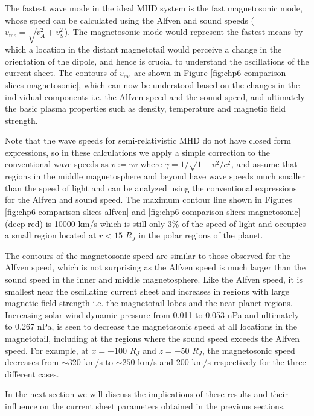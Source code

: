 The fastest wave mode in the ideal MHD system is the fast magnetosonic mode, whose speed can be calculated using the Alfven and sound speeds ($v_\text{ms} = \sqrt{v_A^2 + v_S^2}$). The magnetosonic mode would represent the fastest means by which a location in the distant magnetotail would perceive a change in the orientation of the dipole, and hence is crucial to understand the oscillations of the current sheet. The contours of $v_\text{ms}$ are shown in Figure \ref{fig:chp6-comparison-slices-magnetosonic}, which can now be understood based on the changes in the individual components i.e. the Alfven speed and the sound speed, and ultimately the basic plasma properties such as density, temperature and magnetic field strength. 

Note that the wave speeds for semi-relativistic MHD do not have closed form expressions, so in these calculations we apply a simple correction to the conventional wave speeds as $v := \gamma v$ where $\gamma = 1/\sqrt{1+v^2/c^2}$, and assume that regions in the middle magnetosphere and beyond have wave speeds much smaller than the speed of light and can be analyzed using the conventional expressions for the Alfven and sound speed. The maximum contour line shown in Figures \ref{fig:chp6-comparison-slices-alfven} and \ref{fig:chp6-comparison-slices-magnetosonic} (deep red) is 10000 km/s which is still only 3\% of the speed of light and occupies a small region located at $r < 15$ $R_J$ in the polar regions of the planet. 

The contours of the magnetosonic speed are similar to those observed for the Alfven speed, which is not surprising as the Alfven speed is much larger than the sound speed in the inner and middle magnetosphere. Like the Alfven speed, it is smallest near the oscillating current sheet and increases in regions with large magnetic field strength i.e. the magnetotail lobes and the near-planet regions. Increasing solar wind dynamic pressure from 0.011 to 0.053 nPa and ultimately to 0.267 nPa, is seen to decrease the magnetosonic speed at all locations in the magnetotail, including at the regions where the sound speed exceeds the Alfven speed. For example, at $x=-100$ $R_J$ and $z=-50$ $R_J$, the magnetosonic speed decreases from $\sim320$ km/s to $\sim250$ km/s and $200$ km/s respectively for the three different cases. 

In the next section we will discuss the implications of these results and their influence on the current sheet parameters obtained in the previous sections. 

